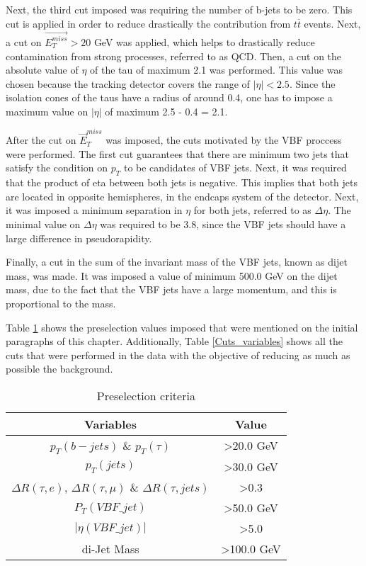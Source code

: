 Next, the third cut imposed was requiring the number of b-jets to be zero. This cut is applied in order to reduce drastically the contribution from $t\overline{t}$ events. Next, a cut on $\vec{E_{T}^{miss}} > 20$ GeV was applied, which helps to drastically reduce contamination from strong processes, referred to as QCD. Then, a cut on the absolute value of $\eta$ of the tau of maximum 2.1 was performed. This value was chosen because the tracking detector covers the range of $|\eta|<2.5$. Since the isolation cones of the taus have a radius of around 0.4, one has to impose a maximum value on $|\eta|$ of maximum 2.5 - 0.4 = 2.1.
  
After the cut on $\vec{E}_T^{miss}$ was imposed, the cuts motivated by the VBF proccess were performed. The first cut guarantees that there are minimum two jets that satisfy the 
condition on $p_T$ to be candidates of VBF jets. Next, it was required that the product of eta between both jets is negative. This implies that both jets are located in opposite hemispheres,
in the endcaps system of the detector. Next, it was imposed a minimum separation in $\eta$ for both jets, referred to as $\Delta \eta$. The minimal value on $\Delta \eta$ was required 
to be 3.8, since the VBF jets should have a large difference in pseudorapidity. 


Finally, a cut in the sum of the invariant mass of the VBF jets, known as dijet mass, was made. It was imposed a value of minimum 500.0 GeV on the dijet mass, due to the fact that the VBF jets have a large momentum, and this is proportional to the mass.  

Table \ref{preselection_table} shows the preselection values imposed that were mentioned on the initial paragraphs of this chapter. Additionally, Table \ref{Cuts_variables} shows all 
the cuts that were performed in the data with the objective of reducing as much as possible the background. 

\begin{table}[h]
\centering
\caption{Preselection criteria}
\label{preselection_table}
\begin{tabular}{|c|c|}
\hline
Variables                                                                & Value                 \\ \hline
$p_T(b-jets)$ \& $p_T(\tau)$                                            & \textgreater 20.0 GeV \\ \hline
$p_T(jets)$                                                             & \textgreater 30.0 GeV  \\ \hline
$\Delta R (\tau, e)$, $\Delta R (\tau, \mu)$ \& $\Delta R (\tau, jets)$ & \textgreater 0.3      \\ \hline
$P_T(VBF\_jet)$                                                          & \textgreater 50.0 GeV \\ \hline
$|\eta(VBF\_jet)|$                                                         & \textgreater5.0       \\ \hline
di-Jet Mass                                                               & \textgreater100.0 GeV \\ \hline
\end{tabular}
\end{table}

